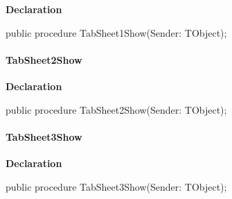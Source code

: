 \documentclass{report}
\newif\ifpdf
\begin{document}
\label{editor.TfrmEditor-TabSheet1Show}
\begin{list}{}{
\setlength{\itemindent}{0cm}
\setlength{\listparindent}{0cm}
\setlength{\leftmargin}{\evensidemargin}
\addtolength{\leftmargin}{\tmplength}
\settowidth{\labelsep}{X}
\addtolength{\leftmargin}{\labelsep}
\setlength{\labelwidth}{\tmplength}
}
\item[\textbf{Declaration}\hfill]
\ifpdf
\begin{flushleft}
\fi
\begin{ttfamily}
public procedure TabSheet1Show(Sender: TObject);\end{ttfamily}

\ifpdf
\end{flushleft}
\fi

\end{list}
\paragraph*{TabSheet2Show}\hspace*{\fill}

\label{editor.TfrmEditor-TabSheet2Show}
\begin{list}{}{
\setlength{\itemindent}{0cm}
\setlength{\listparindent}{0cm}
\setlength{\leftmargin}{\evensidemargin}
\addtolength{\leftmargin}{\tmplength}
\settowidth{\labelsep}{X}
\addtolength{\leftmargin}{\labelsep}
\setlength{\labelwidth}{\tmplength}
}
\item[\textbf{Declaration}\hfill]
\ifpdf
\begin{flushleft}
\fi
\begin{ttfamily}
public procedure TabSheet2Show(Sender: TObject);\end{ttfamily}

\ifpdf
\end{flushleft}
\fi

\end{list}
\paragraph*{TabSheet3Show}\hspace*{\fill}

\label{editor.TfrmEditor-TabSheet3Show}
\begin{list}{}{
\setlength{\itemindent}{0cm}
\setlength{\listparindent}{0cm}
\setlength{\leftmargin}{\evensidemargin}
\addtolength{\leftmargin}{\tmplength}
\settowidth{\labelsep}{X}
\addtolength{\leftmargin}{\labelsep}
\setlength{\labelwidth}{\tmplength}
}
\item[\textbf{Declaration}\hfill]
\ifpdf
\begin{flushleft}
\fi
\begin{ttfamily}
public procedure TabSheet3Show(Sender: TObject);\end{ttfamily}

\ifpdf
\end{flushleft}
\fi

\end{list}
\end{document}
